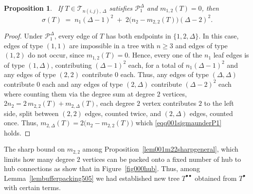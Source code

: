 \documentclass[12pt]{amsart}
\newtheorem{proposition}[theorem]{Proposition}
\newcommand{\TT}{\mathcal{T}}
\begin{document}
\begin{proposition}~\label{propsigmaformula502}
If $T\in \TT_{n(i,j),\,\Delta}$ satisfies $\mathcal P_1^\Delta$ and $m_{1,2}(T)=0$, then
\begin{equation}~\label{eqq001sigmaunderP1}
\sigma(T) \;=\; n_1(\Delta-1)^2 \;+\; 2\big(n_2-m_{2,2}(T)\big)(\Delta-2)^2.
\end{equation}
\end{proposition}
\begin{proof}
Under $\mathcal P_1^\Delta$, every edge of $T$ has both endpoints in $\{1,2,\Delta\}$. In this case, edges of type $(1,1)$ are impossible in a tree with $n\geqslant 3$ and edges of type $(1,2)$ do not occur, since $m_{1,2}(T)=0$. Hence,  every one of the $n_1$
leaf edges is of type $(1,\Delta)$, contributing $(\Delta-1)^2$ each, for a total of $n_1(\Delta-1)^2$ and  any edges of type $(2,2)$ contribute $0$ each. Thus, any edges of type $(\Delta,\Delta)$ contribute $0$ each and any edges of type
$(2,\Delta)$ contribute $(\Delta-2)^2$ each where counting them via the degree sum at degree $2$ vertices, $2n_2 = 2\,m_{2,2}(T) + m_{2,\Delta}(T)$, each
degree $2$ vertex contributes $2$ to the left side, split between $(2,2)$ edges, counted twice, and $(2,\Delta)$ edges, counted once. Thus, 
$m_{2,\Delta}(T)=2\big(n_2-m_{2,2}(T)\big)$ which \eqref{eqq001sigmaunderP1} holds.
\end{proof}



The sharp bound
on $m_{2,2}$ among Proposition~\ref{lem001m22sharpgeneral}, which limits how many degree $2$ vertices can be packed onto a fixed number of hub to hub connections as show that in Figure~\ref{fig000hub}. Thus, among Lemma~\ref{lembufferpacking505} we had established new tree $T^{\bullet\bullet}$ obtained from $T^\bullet$ with certain terms.
\end{document}
